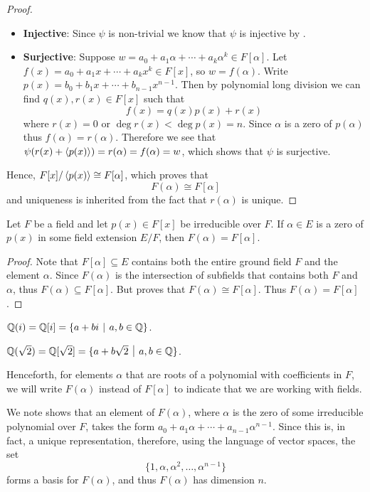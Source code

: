 \begin{proof}
\begin{itemize}
        \item \textbf{Injective}: Since $\psi$ is non-trivial we know that $\psi$ is injective by .

        \item \textbf{Surjective}: Suppose $w = a_0 + a_1\alpha + \cdots + a_k\alpha^k \in F[\alpha]$. Let $f(x) = a_0 + a_1x + \cdots + a_kx^k \in F[x]$, so $w = f(\alpha)$. Write $p(x) = b_0 + b_1x + \cdots + b_{n-1}x^{n-1}$. Then by polynomial long division we can find $q(x), r(x) \in F[x]$ such that
        \[
            f(x) = q(x)p(x) + r(x)
        \]
        where $r(x) = 0$ or $\deg r(x) < \deg p(x) = n$. Since $\alpha$ is a zero of $p(\alpha)$ thus $f(\alpha) = r(\alpha)$. Therefore we see that $\psi(r(x) + \left\langle p(x)\right\rangle) = r(\alpha) = f(\alpha) = w$, which shows that $\psi$ is surjective.
    \end{itemize}
    Hence, $F[x]/\left\langle p(x)\right\rangle \cong F[\alpha]$, which proves that
    \[
        F(\alpha) \cong F[\alpha]
    \]
    and uniqueness is inherited from the fact that $r(\alpha)$ is unique.
\end{proof}
\begin{corollary}
    Let $F$ be a field and let $p(x) \in F[x]$ be irreducible over $F$. If $\alpha \in E$ is a zero of $p(x)$ in some field extension $E/F$, then $F(\alpha) = F[\alpha]$.
\end{corollary}
\begin{proof}
    Note that $F[\alpha] \subseteq E$ contains both the entire ground field $F$ and the element $\alpha$. Since $F(\alpha)$ is the intersection of subfields that contains both $F$ and $\alpha$, thus $F(\alpha) \subseteq F[\alpha]$. But  proves that $F(\alpha) \cong F[\alpha]$. Thus $F(\alpha) = F[\alpha]$.
\end{proof}

\begin{example}
    $\Q(i) = \Q[i] = \{a + bi \vert a, b \in \Q\}$.
\end{example}
\begin{example}
    $\Q(\sqrt 2) = \Q[\sqrt{2}] = \{a + b\sqrt{2} \vert a, b \in \Q\}$.
\end{example}

Henceforth, for elements $\alpha$ that are roots of a polynomial with coefficients in $F$, we will write $F(\alpha)$ instead of $F[\alpha]$ to indicate that we are working with fields.

We note  shows that an element of $F(\alpha)$, where $\alpha$ is the zero of some irreducible polynomial over $F$, takes the form $a_0+a_1\alpha + \cdots + a_{n-1}\alpha^{n-1}$. Since this is, in fact, a unique representation, therefore, using the language of vector spaces, the set
\[
    \{1, \alpha, \alpha^2, \dots, \alpha^{n-1}\}
\]
forms a basis for $F(\alpha)$, and thus $F(\alpha)$ has dimension $n$.

